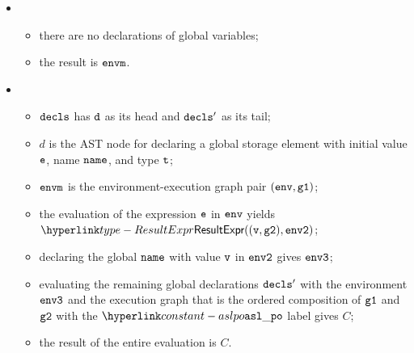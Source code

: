 \ProseParagraph
\OneApplies
\begin{itemize}
  \item {}
  \begin{itemize}
    \item there are no declarations of global variables;
    \item the result is $\envm$.
  \end{itemize}

  \item {}
  \begin{itemize}
    \item $\vdecls$ has $\vd$ as its head and $\vdecls'$ as its tail;
    \item $d$ is the AST node for declaring a global storage element with initial value $\ve$,
          name $\name$, and type $\vt$;
    \item $\envm$ is the environment-execution graph pair $(\env, \vgone)$;
    \item the evaluation of the expression $\ve$ in $\env$ yields $\ResultExpr((\vv, \vgtwo), \envtwo)$\ProseOrAbnormal;
    \item declaring the global $\name$ with value $\vv$ in $\envtwo$ gives $\envthree$;
    \item evaluating the remaining global declarations $\vdecls'$ with the environment $\envthree$ and the execution graph
          that is the ordered composition of $\vgone$ and $\vgtwo$ with the $\aslpo$ label gives $C$;
    \item the result of the entire evaluation is $C$.
  \end{itemize}
\end{itemize}

\FormallyParagraph
\begin{mathpar}
\end{mathpar}

\begin{mathpar}
\end{mathpar}


